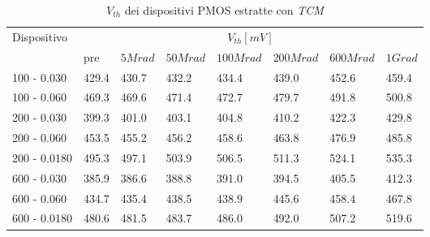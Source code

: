 \documentclass[12pt, letterpaper]{book}
\begin{document}
\begin{table}[H]
  \renewcommand{\arraystretch}{1.3}
  \begin{tabular}{m{2.1cm} m{0.8cm} m{1.1cm} m{1.3cm} m{1.5cm} m{1.5cm} m{1.5cm} m{1cm}}
    \toprule
    \multirow{2}{*}{Dispositivo} & \multicolumn{7}{c}{$V_{th} [mV] $}                                                                    \\
    \cmidrule{2-8}
                                 & pre                                & $5Mrad$ & $50Mrad$ & $100Mrad$ & $200Mrad$ & $600Mrad$ & $1Grad$ \\
    \midrule
    100 - 0.030                     & 429.4                              & 430.7   & 432.2    & 434.4     & 439.0     & 452.6     & 459.4   \\
    \hline
    100 - 0.060                     & 469.3                              & 469.6   & 471.4    & 472.7     & 479.7     & 491.8     & 500.8   \\
    \hline
    200 - 0.030                     & 399.3                              & 401.0   & 403.1    & 404.8     & 410.2     & 422.3     & 429.8   \\
    \hline
    200 - 0.060                     & 453.5                              & 455.2   & 456.2    & 458.6     & 463.8     & 476.9     & 485.8   \\
    \hline
    200 - 0.0180                    & 495.3                              & 497.1   & 503.9    & 506.5     & 511.3     & 524.1     & 535.3   \\
    \hline
    600 - 0.030                     & 385.9                              & 386.6   & 388.8    & 391.0     & 394.5     & 405.5     & 412.3   \\
    \hline
    600 - 0.060                     & 434.7                              & 435.4   & 438.5    & 438.9     & 445.6     & 458.4     & 467.8   \\
    \hline
    600 - 0.0180                    & 480.6                              & 481.5   & 483.7    & 486.0     & 492.0     & 507.2     & 519.6   \\
    \bottomrule
  \end{tabular}
  \caption{$V_{th}$ dei dispositivi PMOS estratte con \emph{TCM}}
  \label{tab:VthTCMP}
\end{table}
\end{document}
